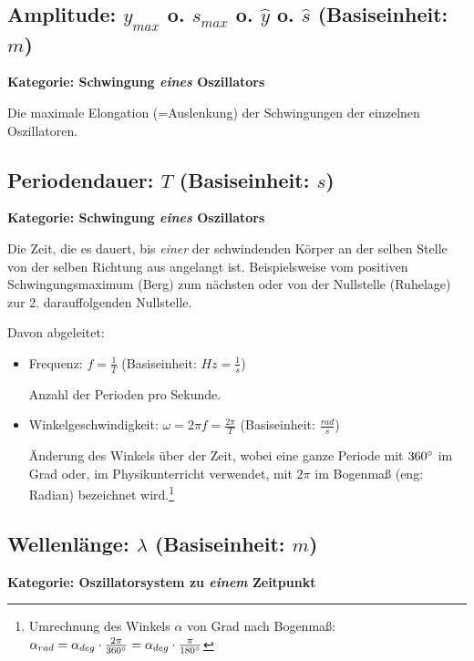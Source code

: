 \subsection[Amplitude]{Amplitude: $y_{max}$ o. $s_{max}$ o. $\hat{y}$ o. $\hat{s}$ (Basiseinheit: $m$)}

\textbf{Kategorie: Schwingung \textit{eines} Oszillators}

\noindent Die maximale Elongation (=\glqq Auslenkung\grqq) der Schwingungen der einzelnen Oszillatoren.



\subsection[Periodendauer]{Periodendauer: $T$ (Basiseinheit: $s$)}

\textbf{Kategorie: Schwingung \textit{eines} Oszillators}
	
\noindent Die Zeit, die es dauert, bis \emph{einer} der schwindenden Körper an der selben Stelle von der selben Richtung aus angelangt ist. Beispielsweise vom positiven Schwingungsmaximum (\glqq Berg\grqq) zum nächsten oder von der Nullstelle (\glqq Ruhelage\grqq) zur 2. darauffolgenden Nullstelle.

Davon abgeleitet:
\begin{itemize}
	\item Frequenz: $f=\frac{1}{T}$ (Basiseinheit: $Hz=\frac{1}{s}$)

	Anzahl der Perioden pro Sekunde.
	\item Winkelgeschwindigkeit: $\omega=2 \pi f=\frac{2 \pi}{T}$ (Basiseinheit: $\frac{rad}{s}$)

	Änderung des Winkels über der Zeit, wobei eine ganze Periode mit $360 \degree$ im Grad oder, im Physikunterricht verwendet, mit $2 \pi$ im Bogenmaß (eng: \glqq Radian\grqq) bezeichnet wird.\footnote{Umrechnung des Winkels $\alpha$ von Grad nach Bogenmaß: $\alpha_{rad} = \alpha_{deg} \cdot \frac{2\pi}{360 \degree} = \alpha_{deg} \cdot \frac{\pi}{180 \degree} $}
\end{itemize}



\subsection[Wellenlänge]{Wellenlänge: $\lambda$ (Basiseinheit: $m$)}

\textbf{Kategorie: Oszillatorsystem zu \emph{einem} Zeitpunkt}

